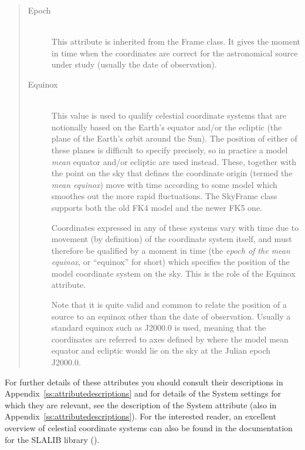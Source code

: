 \documentclass[twoside,11pt]{starlink}
\providecommand{\appref}[1]{Appendix~\ref{#1}}
\begin{document}
\begin{quote}
\begin{description}

\item[\label{ss:epochitem}Epoch]\mbox{}\\
This attribute is inherited from the Frame class. It gives the moment in
time when the coordinates are correct for the astronomical source
under study (usually the date of observation).

\item[\label{ss:equinoxitem}Equinox]\mbox{}\\
This value is used to qualify celestial coordinate systems that are
notionally based on the Earth's equator and/or the ecliptic (the plane
of the Earth's orbit around the Sun). The position of either of these
planes is difficult to specify precisely, so in practice a model
\emph{mean} equator and/or ecliptic are used instead. These, together
with the point on the sky that defines the coordinate origin (termed
the \emph{mean equinox}) move with time according to some model which
smoothes out the more rapid fluctuations. The SkyFrame class supports
both the old FK4 model and the newer FK5 one.

Coordinates expressed in any of these systems vary with time due to
movement (by definition) of the coordinate system itself, and must
therefore be qualified by a moment in time (the \emph{epoch of the mean
equinox}, or ``equinox'' for short) which specifies the position of
the model coordinate system on the sky. This is the role of the
Equinox attribute.

Note that it is quite valid and common to relate the position of a
source to an equinox other than the date of observation. Usually a
standard equinox such as J2000.0 is used, meaning that the coordinates
are referred to axes defined by where the model mean equator and
ecliptic would lie on the sky at the Julian epoch J2000.0.
\end{description}
\end{quote}

For further details of these attributes you should consult their
descriptions in \appref{ss:attributedescriptions} and for details of
the System settings for which they are relevant, see the description
of the System attribute (also in \appref{ss:attributedescriptions}).
For the interested reader, an excellent overview of celestial
coordinate systems can also be found in the documentation for the
SLALIB library ().
\end{document}
